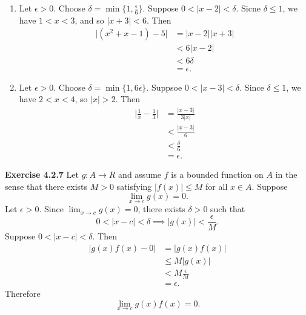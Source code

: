 \documentclass[12pt]{article}
\begin{document}
\begin{enumerate}[label=(\alph*)]
    \item Let \( \epsilon > 0 \). Choose \( \delta = \min \{1, \frac{\epsilon}{6}\} \). Suppose \( 0 < \vert x - 2 \vert < \delta  \). Sicne \( \delta \leq 1 \), we have \( 1 < x < 3 \), and so \( \vert x + 3 \vert < 6 \). Then
          \[
              \begin{split}
                  \vert (x^2 + x - 1) -5 \vert & = \vert x -2 \vert \vert x + 3 \vert \\
                                               & < 6 \vert x -2 \vert                 \\
                                               & < 6 \delta                           \\
                                               & = \epsilon.
              \end{split}
          \]
    \item Let \( \epsilon > 0 \). Choose \( \delta = \min \{1, 6\epsilon\} \). Suppsoe \( 0 < \vert x - 3 \vert < \delta  \). Since \( \delta \leq 1 \), we have \( 2 < x < 4 \), so \( \vert x \vert >2 \). Then
          \[
              \begin{split}
                  \vert \frac{1}{x} - \frac{1}{3} \vert & = \frac{\vert x -3 \vert }{3\vert x \vert } \\
                                                        & < \frac{\vert x -3 \vert }{6}               \\
                                                        & < \frac{\delta}{6}                          \\
                                                        & = \epsilon.
              \end{split}
          \]

\end{enumerate}

\textbf{Exercise 4.2.7}
Let \( g: A \to R \) and assume \( f \) is a bounded function on \( A \) in the sense that there exists \( M > 0 \) satisfying \( \vert f(x) \vert \leq M \) for all \( x \in A \). Suppose
\[
    \lim_{x \to c} g(x) = 0.
\]
Let \( \epsilon > 0 \). Since \( \lim_{x \to c} g(x) = 0 \), there exists \( \delta > 0 \) such that
\[
    0 < \vert x - c \vert < \delta \implies \vert g(x) \vert < \frac{\epsilon}{M}.
\]
Suppose \( 0 < \vert x - c \vert < \delta \). Then
\[
    \begin{split}
        \vert g(x)f(x) - 0 \vert & = \vert g(x)f(x) \vert   \\
                                 & \leq  M \vert g(x) \vert \\
                                 & < M \frac{\epsilon}{M}   \\
                                 & = \epsilon.
    \end{split}
\]
Therefore
\[
    \lim_{x \to c} g(x) f(x) = 0.
\]
\end{document}

